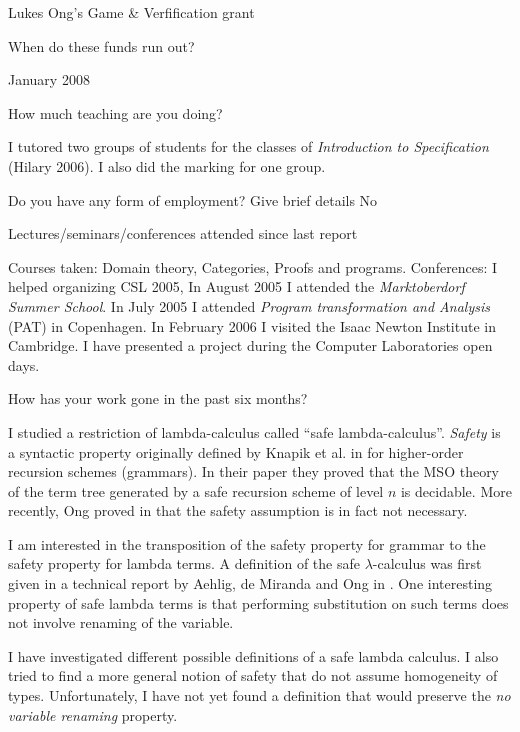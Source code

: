 \documentclass{article}
\def\answ#1{#1 \vspace{0.5em}}
\newcounter{SQcount}
\newenvironment{subq}{
\begin{list}
    {} %
    {   \usecounter{SQcount}
        \renewcommand{\makelabel}[1]{\stepcounter{SQcount} \textbf{\alph{SQcount}) \parbox[t]{0.8\linewidth}{{##1}}}  }
        \setlength{\rightmargin}{\leftmargin}
    }
}
{\end{list}}
\begin{document}
\begin{list}
\begin{subq}
    \answ{Lukes Ong's Game \& Verfification grant }

\item[When do these funds run out?] \

   \answ{January 2008}

\end{subq}

\item[How much teaching are you doing?] \

\answ{I tutored two groups of students for the classes of
\emph{Introduction to Specification }(Hilary 2006). I also did the
marking for one group.}

\item[Do you have any form of employment? Give brief details]
\answ{No}

\item[Lectures/seminars/conferences attended since last report] \

\answ{Courses taken: Domain theory, Categories, Proofs and programs. Conferences: I helped organizing CSL 2005,
In August 2005 I attended the \emph{Marktoberdorf Summer School}. In July 2005 I attended \emph{Program transformation and Analysis} (PAT) in Copenhagen.
In February 2006 I visited the Isaac Newton Institute in Cambridge. I have presented a project during the Computer Laboratories open days.
}

\item[How has your work gone in the past six months?] \

\answ{ I studied a restriction of lambda-calculus called ``safe
lambda-calculus''. \emph{Safety} is a syntactic property originally
defined by Knapik et al. in \cite{KNU02} for higher-order recursion
schemes (grammars). In their paper they proved that the MSO theory
of the term tree generated by a safe recursion scheme of level $n$
is decidable. More recently, Ong proved in \cite{OngLics2006} that
the safety assumption is in fact not necessary.}

I am interested in the transposition of the safety property for
grammar to the safety property for lambda terms. A definition of the
safe $\lambda$-calculus was first given in a technical report by
Aehlig, de Miranda and Ong in \cite{safety-mirlong2004}. One
interesting property of safe lambda terms is that performing
substitution on such terms does not involve renaming of the
variable.

I have investigated different possible definitions of a safe lambda
calculus. I also tried to find a more general notion of safety that
do not assume homogeneity of types. Unfortunately, I have not yet
found a definition that would preserve the \emph{no variable
renaming} property.


\end{list}
\end{document}
